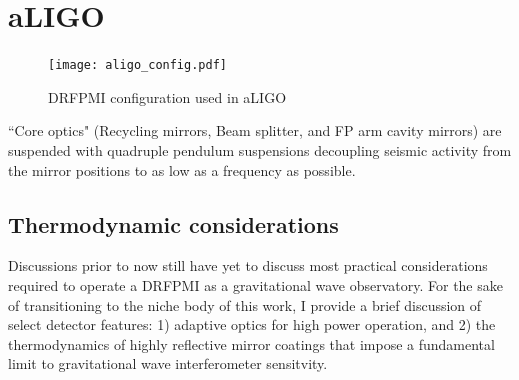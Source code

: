 \section{aLIGO}

\begin{figure}[H]
  \begin{center}
	  \texttt{[image: aligo\_config.pdf]}
  \end{center}
  \caption{DRFPMI configuration used in aLIGO~\cite{aasi:2015}}
  \label{fig:simple_michelson}
\end{figure}

``Core optics" (Recycling mirrors, Beam splitter, and FP arm cavity mirrors) are suspended with quadruple pendulum suspensions decoupling seismic activity from the mirror positions to as low as a frequency as possible. 

\subsection{Thermodynamic considerations}
Discussions prior to now still have yet to discuss most practical considerations required to operate a DRFPMI as a gravitational wave observatory. For the sake of transitioning to the niche body of this work, I provide a brief discussion of select detector features: 1) adaptive optics for high power operation, and 2) the thermodynamics of highly reflective mirror coatings that impose a fundamental limit to gravitational wave interferometer sensitvity. 



